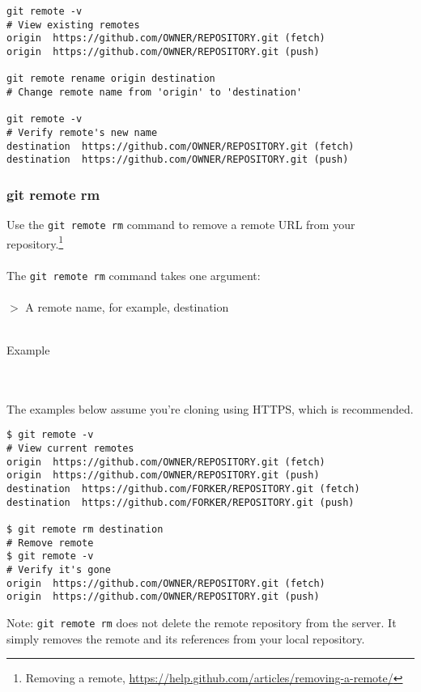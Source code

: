 \documentclass[12pt,letterpaper,dvips]{article}
\newcommand{\cmd}[1]{\texttt{#1}}
\begin{document}
\begin{Verbatim}
git remote -v
# View existing remotes
origin  https://github.com/OWNER/REPOSITORY.git (fetch)
origin  https://github.com/OWNER/REPOSITORY.git (push)

git remote rename origin destination
# Change remote name from 'origin' to 'destination'

git remote -v
# Verify remote's new name
destination  https://github.com/OWNER/REPOSITORY.git (fetch)
destination  https://github.com/OWNER/REPOSITORY.git (push)
\end{Verbatim}


\subsubsection{git remote rm}
Use the \cmd{git remote rm} command to remove a remote URL
from your repository.\footnote{Removing a remote,
\href{https://help.github.com/articles/removing-a-remote/}{https://help.github.com/articles/removing-a-remote/}}
\\
\\
The \cmd{git remote rm} command takes one argument:
\\
\\
$>$ A remote name, for example, destination
\\
\\
\noindent \begin{bf}Example\end{bf}
\\
\\
The examples below assume you're cloning using HTTPS, which is recommended.

\begin{Verbatim}
$ git remote -v
# View current remotes
origin  https://github.com/OWNER/REPOSITORY.git (fetch)
origin  https://github.com/OWNER/REPOSITORY.git (push)
destination  https://github.com/FORKER/REPOSITORY.git (fetch)
destination  https://github.com/FORKER/REPOSITORY.git (push)

$ git remote rm destination
# Remove remote
$ git remote -v
# Verify it's gone
origin  https://github.com/OWNER/REPOSITORY.git (fetch)
origin  https://github.com/OWNER/REPOSITORY.git (push)
\end{Verbatim}

\noindent Note: \cmd{git remote rm} does not delete the remote
repository from the server.  It simply removes the remote and
its references from your local repository.
\end{document}

